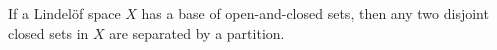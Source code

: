 If a Lindelöf space $X$ has a base of open-and-closed sets, then any two disjoint closed sets in $X$ are separated by a partition.
